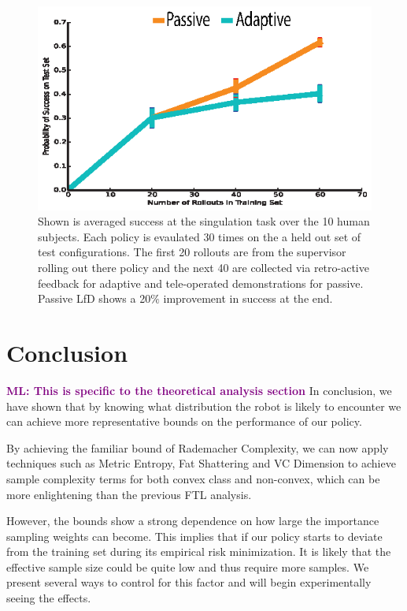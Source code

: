 \documentclass[10pt, conference]{ieeeconf}      %
\newcommand{\mlnote}[1]{\ifthenelse{ \boolean{include-notes}}%
 {\textcolor{purple}{\textbf{ML: #1}}}{}}
\begin{document}
\begin{figure}
\centering
\includegraphics{f_figs/izzy_reward.eps}
\caption{
    \footnotesize
Shown is averaged success at the singulation task over the 10 human subjects. Each policy is evaulated 30 times on the a held out set of test configurations. The first 20 rollouts are from the supervisor rolling out there policy and the next 40 are collected via retro-active feedback for adaptive and tele-operated demonstrations for passive. Passive LfD shows a 20$\%$ improvement in success at the end. }
\vspace*{-20pt}
\label{fig:izzy_rw}
\end{figure}




  



\section{Conclusion}
\mlnote{This is specific to the theoretical analysis section}
In conclusion, we have shown that by knowing what distribution the robot is likely to encounter we can achieve more representative bounds on the performance of our policy. 

By achieving the familiar bound of Rademacher Complexity, we can now apply techniques such as Metric Entropy, Fat Shattering and VC Dimension to achieve sample complexity terms for both convex class and non-convex, which can be more enlightening than the previous FTL analysis. 

However, the bounds show a strong dependence on how large the importance sampling weights can become. This implies that if our policy starts to deviate from the training set during its empirical risk minimization. It is likely that the effective sample size could be quite low and thus require more samples. We present several ways to control for this factor and will begin experimentally seeing the effects.  



\end{document}
